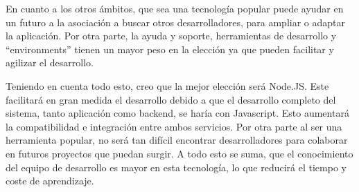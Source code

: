 En cuanto a los otros ámbitos, que sea una tecnología popular puede ayudar en un futuro a la asociación a buscar otros desarrolladores, para ampliar o adaptar la aplicación. Por otra parte, la ayuda y soporte, herramientas de desarrollo y ``environments'' tienen un mayor peso en la elección ya que pueden facilitar y agilizar el desarrollo. 

Teniendo en cuenta todo esto, creo que la mejor elección será Node.JS. Este facilitará en gran medida el desarrollo debido a que el desarrollo completo del sistema, tanto aplicación como backend, se haría con Javascript. Esto aumentará la compatibilidad e integración entre ambos servicios. Por otra parte al ser una herramienta popular, no será tan difícil encontrar desarrolladores para colaborar en futuros proyectos que puedan surgir. A todo esto se suma, que el conocimiento del equipo de desarrollo es mayor en esta tecnología, lo que reducirá el tiempo y coste de aprendizaje.
